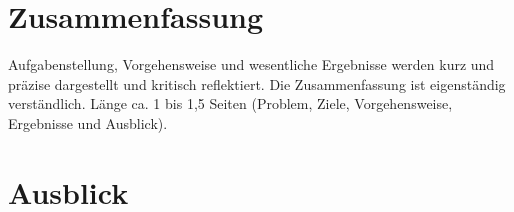 
\chapter{Zusammenfassung}
Aufgabenstellung, Vorgehensweise und wesentliche Ergebnisse werden kurz und präzise dargestellt und kritisch reflektiert. Die Zusammenfassung ist eigenständig verständlich. Länge ca. 1 bis 1,5 Seiten (Problem, Ziele, Vorgehensweise, Ergebnisse und Ausblick).

\chapter{Ausblick}

